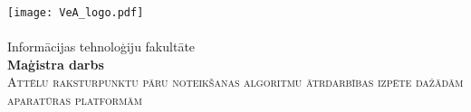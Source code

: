 \begin{titlepage}
	\newsavebox{\veatext}
	\newlength{\veatextwidth}
	\settowidth{\veatextwidth}{\usebox{\veatext}}
	\centering\texttt{[image: VeA\_logo.pdf]}\\[4pt]
	\usebox{\veatext}\\[6pt]
	\large Informācijas tehnoloģiju fakultāte\\[1.5cm]
	
	\textbf{Maģistra darbs}\\[1cm]
	
	\textsc{\Large Attēlu raksturpunktu pāru noteikšanas algoritmu ātrdarbības izpēte dažādām aparatūras platformām}
	\vfill %
	

\end{titlepage}
